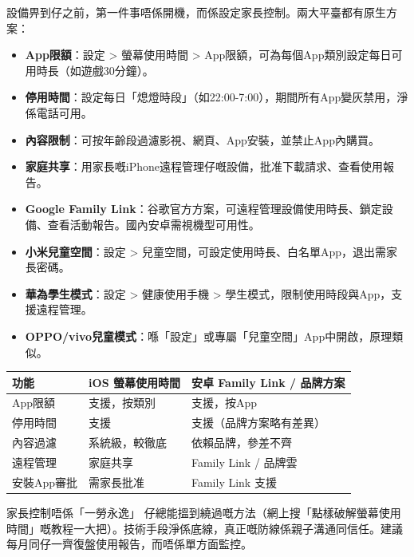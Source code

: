 
設備畀到仔之前，第一件事唔係開機，而係設定家長控制。兩大平臺都有原生方案：


\begin{itemize}
  \item \textbf{App限額}：設定 > 螢幕使用時間 > App限額，可為每個App類別設定每日可用時長（如遊戲30分鐘）。
  \item \textbf{停用時間}：設定每日「熄燈時段」（如22:00-7:00），期間所有App變灰禁用，淨係電話可用。
  \item \textbf{內容限制}：可按年齡段過濾影視、網頁、App安裝，並禁止App內購買。
  \item \textbf{家庭共享}：用家長嘅iPhone遠程管理仔嘅設備，批准下載請求、查看使用報告。
\end{itemize}


\begin{itemize}
  \item \textbf{Google Family Link}：谷歌官方方案，可遠程管理設備使用時長、鎖定設備、查看活動報告。國內安卓需視機型可用性。
  \item \textbf{小米兒童空間}：設定 > 兒童空間，可設定使用時長、白名單App，退出需家長密碼。
  \item \textbf{華為學生模式}：設定 > 健康使用手機 > 學生模式，限制使用時段與App，支援遠程管理。
  \item \textbf{OPPO/vivo兒童模式}：喺「設定」或專屬「兒童空間」App中開啟，原理類似。
\end{itemize}

\begin{center}
\begin{tabularx}{\linewidth}{|X|X|X|}
\hline
\textbf{功能} & \textbf{iOS 螢幕使用時間} & \textbf{安卓 Family Link / 品牌方案} \tabularnewline
\hline
App限額 & 支援，按類別 & 支援，按App \tabularnewline
停用時間 & 支援 & 支援（品牌方案略有差異） \tabularnewline
內容過濾 & 系統級，較徹底 & 依賴品牌，參差不齊 \tabularnewline
遠程管理 & 家庭共享 & Family Link / 品牌雲 \tabularnewline
安裝App審批 & 需家長批准 & Family Link 支援 \tabularnewline
\hline
\end{tabularx}
\end{center}

\begin{tcbwarn}{家長控制唔係「一勞永逸」}
仔總能搵到繞過嘅方法（網上搜「點樣破解螢幕使用時間」嘅教程一大把）。技術手段淨係底線，真正嘅防線係親子溝通同信任。建議每月同仔一齊復盤使用報告，而唔係單方面監控。

\end{tcbwarn}

